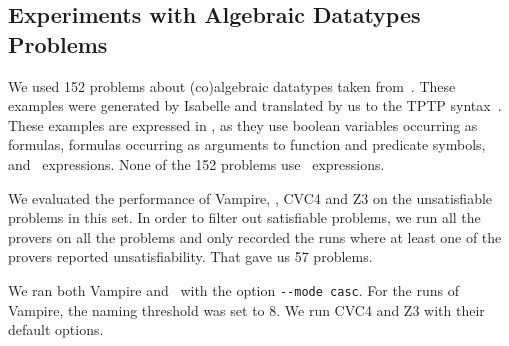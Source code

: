%
%


\subsection[Experiments with Algebraic Datatypes Problems]{Experiments with Algebraic Datatypes\\Problems}\label{subsec:ADT}
We used 152 problems about (co)algebraic datatypes taken from~\cite{Blanchette15}. 
These examples were generated by Isabelle and translated by us to the TPTP syntax~\cite{TPTP}. 
These examples are expressed in \folb{}, as they use boolean variables occurring as formulas, formulas occurring as arguments to function and predicate symbols, and \ITE\ expressions. None of the 152 problems use \LETIN\ expressions.

We evaluated the performance of Vampire, \oldcnfVampire,
CVC4 and Z3 on the unsatisfiable problems in this set. In order to filter out satisfiable problems, we run all the provers on all the problems 
and only recorded the runs where at least one of the provers reported unsatisfiability. That gave us 57 problems.

We ran both Vampire and \oldcnfVampire\ with the option \verb'--mode casc'. For the runs of Vampire, the naming threshold was set to 8. We run CVC4 and Z3 with their default options.

